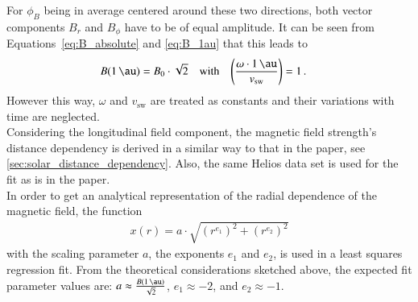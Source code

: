 For $\phi_B$ being in average centered around these two directions, both vector components $B_r$ and $B_\phi$ have to be of equal amplitude. It can be seen from Equations~\ref{eq:B_absolute} and \ref{eq:B_1au} that this leads to
\begin{align}
	B(\SI{1}{\au}) &= B_0 \cdot \sqrt{2}	&\text{with}	&	&	\left(\frac{\omega\cdot\SI{1}{\au}}{v_\text{sw}}\right) &= 1\,.
\end{align}
However this way, $\omega$ and $v_\text{sw}$ are treated as constants and their variations with time are neglected.\\

Considering the longitudinal field component, the magnetic field strength's distance dependency is derived in a similar way to that in the paper, see \autoref{sec:solar_distance_dependency}. Also, the same Helios data set is used for the fit as is in the paper.\\

In order to get an analytical representation of the radial dependence of the magnetic field, the function
\begin{align}
	x(r) = a \cdot \sqrt{\left(r^{e_1}\right)^2 + \left(r^{e_2}\right)^2}	\label{eq:sqare_power_law}
\end{align}
with the scaling parameter $a$, the exponents $e_1$ and $e_2$, is used in a least squares regression fit. From the theoretical considerations sketched above, the expected fit parameter values are: $a \approx \frac{B(\SI{1}{\au})}{\sqrt{2}}$, $e_1 \approx -2$, and $e_2 \approx -1$.\\

